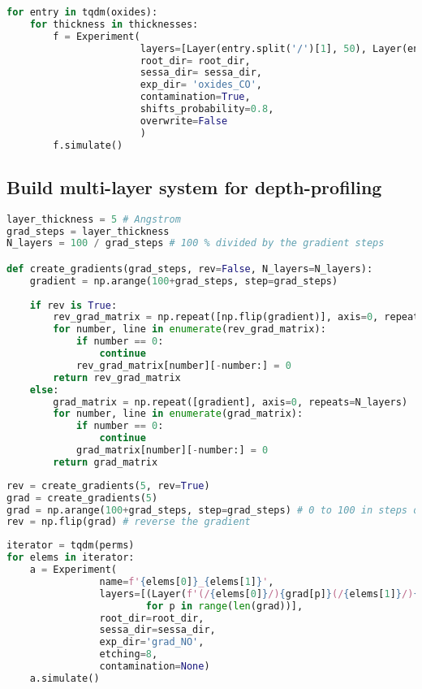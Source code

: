 \begin{lstlisting}[language=Python]
for entry in tqdm(oxides):
    for thickness in thicknesses:
        f = Experiment(
                       layers=[Layer(entry.split('/')[1], 50), Layer(entry, thickness)],
                       root_dir= root_dir,
                       sessa_dir= sessa_dir,
                       exp_dir= 'oxides_CO',
                       contamination=True,
                       shifts_probability=0.8,
                       overwrite=False
                       )
        f.simulate()
\end{lstlisting}

\hypertarget{build-multi-layer-system-for-depth-profiling}{%
\subsection*{Build multi-layer system for
depth-profiling}\label{build-multi-layer-system-for-depth-profiling}}

\begin{lstlisting}[language=Python]
layer_thickness = 5 # Angstrom
grad_steps = layer_thickness
N_layers = 100 / grad_steps # 100 % divided by the gradient steps

def create_gradients(grad_steps, rev=False, N_layers=N_layers):
    gradient = np.arange(100+grad_steps, step=grad_steps)
    
    if rev is True: 
        rev_grad_matrix = np.repeat([np.flip(gradient)], axis=0, repeats=N_layers)
        for number, line in enumerate(rev_grad_matrix):
            if number == 0:
                continue
            rev_grad_matrix[number][-number:] = 0
        return rev_grad_matrix
    else:
        grad_matrix = np.repeat([gradient], axis=0, repeats=N_layers)
        for number, line in enumerate(grad_matrix):
            if number == 0:
                continue
            grad_matrix[number][-number:] = 0
        return grad_matrix
\end{lstlisting}

\begin{lstlisting}[language=Python]
rev = create_gradients(5, rev=True)
grad = create_gradients(5)
grad = np.arange(100+grad_steps, step=grad_steps) # 0 to 100 in steps of grad_steps
rev = np.flip(grad) # reverse the gradient
\end{lstlisting}

\begin{lstlisting}[language=Python]
iterator = tqdm(perms)
for elems in iterator:
    a = Experiment(
                name=f'{elems[0]}_{elems[1]}',
                layers=[(Layer(f'(/{elems[0]}/){grad[p]}(/{elems[1]}/){rev[p]}', thickness=5))
                        for p in range(len(grad))],
                root_dir=root_dir,
                sessa_dir=sessa_dir,
                exp_dir='grad_NO',
                etching=8,
                contamination=None)
    a.simulate()
\end{lstlisting}

